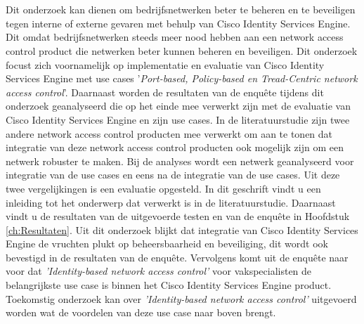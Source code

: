 \chapter*{}
\label{ch:Samenvatting}

Dit onderzoek kan dienen om bedrijfsnetwerken beter te beheren en te beveiligen tegen interne of externe gevaren met behulp van Cisco Identity Services Engine. Dit omdat bedrijfsnetwerken steeds meer nood hebben aan een network access control product die netwerken beter kunnen beheren en beveiligen. Dit onderzoek focust zich voornamelijk op implementatie en evaluatie van Cisco Identity Services Engine met use cases '\textit{Port-based, Policy-based en Tread-Centric network access control}'. 
\newline
\newline
Daarnaast worden de resultaten van de enquête tijdens dit onderzoek geanalyseerd die op het einde mee verwerkt zijn met de evaluatie van Cisco Identity Services Engine en zijn use cases. In de literatuurstudie zijn twee andere network access control producten mee verwerkt om aan te tonen dat integratie van deze network access control producten ook mogelijk zijn om een netwerk robuster te maken. Bij de analyses wordt een netwerk geanalyseerd voor integratie van de use cases en eens na de integratie van de use cases. Uit deze twee vergelijkingen is een evaluatie opgesteld. In dit geschrift vindt u een inleiding tot het onderwerp dat verwerkt is in de literatuurstudie. Daarnaast vindt u de resultaten van de uitgevoerde testen en van de enquête in Hoofdstuk \ref{ch:Resultaten}. 
\newline
\newline
Uit dit onderzoek blijkt dat integratie van Cisco Identity Services Engine de vruchten plukt op beheersbaarheid en beveiliging, dit wordt ook bevestigd in de resultaten van de enquête. Vervolgens komt uit de enquête naar voor dat \textit{'Identity-based network access control'} voor vakspecialisten de belangrijkste use case is binnen het Cisco Identity Services Engine product. Toekomstig onderzoek kan over \textit{'Identity-based network access control'} uitgevoerd worden wat de voordelen van deze use case naar boven brengt.

